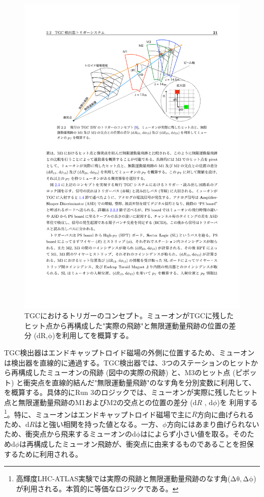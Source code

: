 \begin{figure} 
\centering
\includegraphics[width=16cm]{fig/Intro/TGC_triggerconcept.pdf}
\caption[TGCにおけるトリガーのコンセプト]{TGCにおけるトリガーのコンセプト\cite{mt_akatsuka}。ミューオンがTGCに残したヒット点から再構成した"実際の飛跡"と無限運動量飛跡の位置の差分 ($\mathrm{dR}$,$\mathrm{\phi}$)を利用して\pt を概算する。}
\label{TGC_triggerconcept}
\end{figure}

TGC検出器はエンドキャップトロイド磁場の外側に位置するため、ミューオンは検出器を直線的に通過する。TGC検出器では、3つのステーションのヒットから再構成したミューオンの飛跡 (図中の実際の飛跡) と、M3のヒット点 (ピボット) と衝突点を直線的結んだ"無限運動量飛跡"のなす角を分別変数に利用して、\pt を概算する。具体的にRun 3のロジックでは、ミューオンが実際に残したヒット点と無限運動量飛跡のM1およびM2の交点との位置の差分  ($\mathrm{d}R$ , $\mathrm{d}\phi$)を 利用する\footnote{高輝度LHC-ATLAS実験では実際の飛跡と無限運動量飛跡のなす角($\mathrm{\Delta\theta, \Delta\phi}$)が利用される。本質的に等価なロジックである。}。特に、ミューオンはエンドキャップトロイド磁場で主に$R$方向に曲げられるため、$\mathrm{d}R$は\pt と強い相関を持った値となる。一方、$\phi$方向にはあまり曲げられないため、衝突点から飛来するミューオンの$\mathrm{d\phi}$は\pt によらず小さい値を取る。そのため$\mathrm{d}\phi$は再構成したミューオン飛跡が、衝突点に由来するものであることを担保するために利用される。

